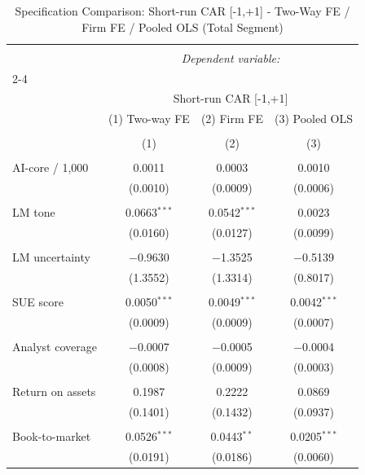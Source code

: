 
\begin{table}[!htbp] \centering 
  \caption{Specification Comparison: Short-run CAR [-1,+1] - Two-Way FE / Firm FE / Pooled OLS (Total Segment)} 
  \label{} 
\begin{tabular}{@{\extracolsep{5pt}}lccc} 
\\[-1.8ex]\hline 
\hline \\[-1.8ex] 
 & \multicolumn{3}{c}{\textit{Dependent variable:}} \\ 
\cline{2-4} 
\\[-1.8ex] & \multicolumn{3}{c}{Short-run CAR [-1,+1]} \\ 
 & (1) Two-way FE & (2) Firm FE & (3) Pooled OLS \\ 
\\[-1.8ex] & (1) & (2) & (3)\\ 
\hline \\[-1.8ex] 
 AI-core / 1,000 & 0.0011 & 0.0003 & 0.0010 \\ 
  & (0.0010) & (0.0009) & (0.0006) \\ 
  & & & \\ 
 LM tone & 0.0663$^{***}$ & 0.0542$^{***}$ & 0.0023 \\ 
  & (0.0160) & (0.0127) & (0.0099) \\ 
  & & & \\ 
 LM uncertainty & $-$0.9630 & $-$1.3525 & $-$0.5139 \\ 
  & (1.3552) & (1.3314) & (0.8017) \\ 
  & & & \\ 
 SUE score & 0.0050$^{***}$ & 0.0049$^{***}$ & 0.0042$^{***}$ \\ 
  & (0.0009) & (0.0009) & (0.0007) \\ 
  & & & \\ 
 Analyst coverage & $-$0.0007 & $-$0.0005 & $-$0.0004 \\ 
  & (0.0008) & (0.0009) & (0.0003) \\ 
  & & & \\ 
 Return on assets & 0.1987 & 0.2222 & 0.0869 \\ 
  & (0.1401) & (0.1432) & (0.0937) \\ 
  & & & \\ 
 Book-to-market & 0.0526$^{***}$ & 0.0443$^{**}$ & 0.0205$^{***}$ \\ 
  & (0.0191) & (0.0186) & (0.0060) \\ 

\end{tabular}
\end{table}
